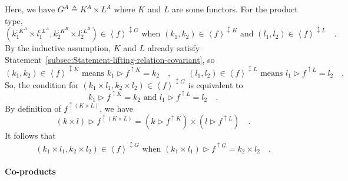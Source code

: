 Here, we have $G^{A}\triangleq K^{A}\times L^{A}$ where $K$ and
$L$ are some functors. For the product type,
\[
(k_{1}^{:K^{A}}\times l_{1}^{:L^{A}},k_{2}^{:K^{B}}\times l_{2}^{:L^{B}})\in\left<f\right>^{\updownarrow G}\text{ when }(k_{1},k_{2})\in\left<f\right>^{\updownarrow K}\text{ and }(l_{1},l_{2})\in\left<f\right>^{\updownarrow L}\quad.
\]
By the inductive assumption, $K$ and $L$ already satisfy Statement~\ref{subsec:Statement-lifting-relation-covariant},
so
\[
(k_{1},k_{2})\in\left<f\right>^{\updownarrow K}\text{ means }k_{1}\triangleright f^{\uparrow K}=k_{2}\quad,\quad\quad(l_{1},l_{2})\in\left<f\right>^{\updownarrow L}\text{ means }l_{1}\triangleright f^{\uparrow L}=l_{2}\quad.
\]
So, the condition for $(k_{1}\times l_{1},k_{2}\times l_{2})\in\left<f\right>^{\updownarrow G}$
is equivalent to
\[
k_{1}\triangleright f^{\uparrow K}=k_{2}\text{ and }l_{1}\triangleright f^{\uparrow L}=l_{2}\quad.
\]
By definition of $f^{\uparrow(K\times L)}$, we have 
\[
(k\times l)\triangleright f^{\uparrow(K\times L)}=(k\triangleright f^{\uparrow K})\times(l\triangleright f^{\uparrow L})\quad.
\]
It follows that
\[
(k_{1}\times l_{1},k_{2}\times l_{2})\in\left<f\right>^{\updownarrow G}\text{ when }(k_{1}\times l_{1})\triangleright f^{\uparrow G}=k_{2}\times l_{2}\quad.
\]


\paragraph{Co-products}

